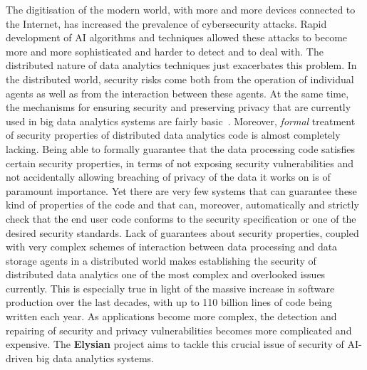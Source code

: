 \documentclass[a4paper,11pt]{article}
\newcommand{\project}[1]{\textbf{#1}\xspace}
\newcommand{\SECURITY}{\project{Elysian}}
\newcommand{\TheProject}{\SECURITY}
\begin{document}
The digitisation of the modern world, with more and more devices connected to the Internet, has increased the prevalence of cybersecurity attacks. Rapid development of AI algorithms and techniques allowed these attacks to become more and more sophisticated and harder to detect and to deal with. The distributed nature of data analytics techniques just exacerbates this problem. In the distributed world, security risks come both from the operation of individual agents as well as from the interaction between these agents. At the same time, the mechanisms for ensuring security and preserving privacy that are currently used in big data analytics systems are fairly basic~\cite{basicSecurityBigData}. Moreover, \emph{formal} treatment of security properties of distributed data analytics code is almost completely lacking. Being able to formally guarantee that the data processing code satisfies certain security properties, in terms of not exposing security vulnerabilities and not accidentally allowing breaching of privacy of the data it works on is of paramount importance. Yet there are very few systems that can guarantee these kind of properties of the code and that can, moreover, automatically and strictly check that the end user code conforms to the security specification or one of the desired security standards. Lack of guarantees about security properties, coupled with very complex schemes of interaction between data processing and data storage agents in a distributed world makes establishing the security of distributed data analytics one of the most complex and overlooked issues currently. This is especially true in light of the massive increase in software production over the last decades, with up to 110 billion lines of code being written each year. As applications become more complex, the detection and repairing of security and privacy vulnerabilities becomes more complicated and expensive. The \TheProject{} project aims to tackle this crucial issue of security of AI-driven big data analytics systems.
\end{document}
